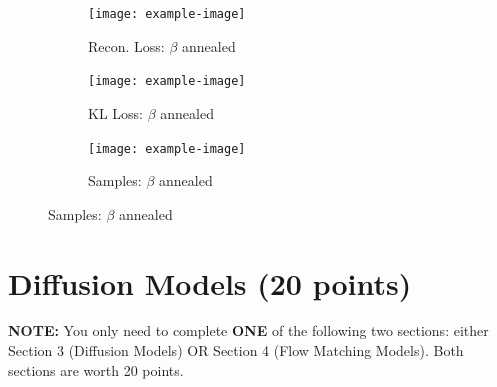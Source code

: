 \documentclass[11pt,addpoints,answers]{exam}
\numberwithin{equation}{section} %
\numberwithin{figure}{section} %
\numberwithin{table}{section} %
\begin{document}
\begin{questions}
\begin{solution}
\begin{figure}[H]
    \begin{subfigure}[b]{0.32\linewidth}
    \texttt{[image: example-image]}
    \caption{Recon. Loss: $\beta$ annealed}
    \end{subfigure}
    \begin{subfigure}[b]{0.32\linewidth}
    \texttt{[image: example-image]}
    \caption{KL Loss: $\beta$ annealed}
    \end{subfigure}
    \begin{subfigure}[b]{0.32\linewidth}
    \texttt{[image: example-image]}
    \caption{Samples: $\beta$ annealed}
    \end{subfigure}
\end{figure}
\end{solution}
\end{questions}
\newpage

\section{Diffusion Models (20 points)}
\begin{notebox}
\textbf{NOTE:} You only need to complete \textbf{ONE} of the following two sections: either Section 3 (Diffusion Models) OR Section 4 (Flow Matching Models). Both sections are worth 20 points.
\end{notebox}
\end{document}
